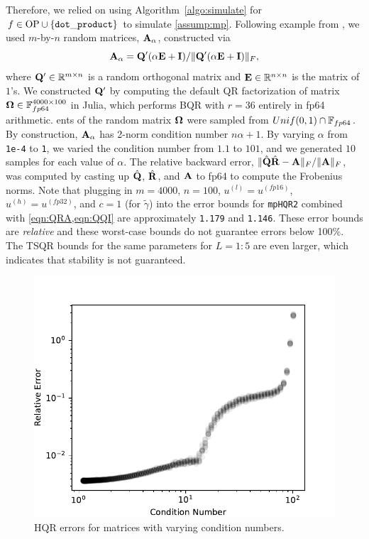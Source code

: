 Therefore, we relied on using Algorithm~\ref{algo:simulate} for $f\in \text{OP} \cup\{{\tt dot\_product}\}$ to simulate \cref{assump:mp}.
Following example from \cite{Mori2012}, we used $m$-by-$n$ random matrices, $\mathbf{A}_{\alpha}$, constructed via
\begin{equation}
\bb{A}_{\alpha} = \bb{Q'}(\alpha \bb{E} + \bb{I})/\|\bb{Q'}(\alpha \bb{E} + \bb{I})\|_F,
\label{eqn:genRM}
\end{equation}
where $\mathbf{Q'}\in\mathbb{R}^{m\times n}$ is a random orthogonal matrix and $\mathbf{E}\in\mathbb{R}^{n\times n}$ is the matrix of $1$'s. 
We constructed $\mathbf{Q'}$ by computing the default QR factorization of matrix $\mathbf{\Omega}\in\mathbb{F}_{fp64}^{4000\times100}$ in Julia, which performs BQR with $r=36$ entirely in fp64 arithmetic.                                                                                                                    ents of the random matrix $\mathbf{\Omega}$ were sampled from $Unif(0,1)\cap \mathbb{F}_{fp64}$.
By construction, $\mathbf{A}_{\alpha}$ has 2-norm condition number $n\alpha+1$. 
By varying $\alpha$ from {\tt 1e-4} to {\tt 1}, we varied the condition number from $1.1$ to $101$, and we generated $10$ samples for each value of $\alpha$.
The relative backward error, $\|\hat{\mathbf{Q}}\hat{\mathbf{R}}-\mathbf{A}\|_F/\|\mathbf{A}\|_F$, was computed by casting up $\hat{\mathbf{Q}}$, $\hat{\mathbf{R}}$, and $\mathbf{A}$ to fp64 to compute the Frobenius norms.
Note that plugging in $m=4000$, $n=100$, $u^{(l)}=u^{(fp16)}$, $u^{(h)}=u^{(fp32)}$, and $c=1$ (for $\tilde{\gamma}$) into the error bounds for {\tt mpHQR2} combined with \cref{eqn:QRA,eqn:QQI} are approximately {\tt 1.179} and {\tt 1.146}.
These error bounds are \emph{relative} and these worst-case bounds do not guarantee errors below 100\%.
The TSQR bounds for the same parameters for $L=1:5$ are even larger, which indicates that stability is not guaranteed. 
\begin{figure}
	\centering
	\vspace{-10pt}
	\includegraphics[width=.3\textwidth]{./figures/unblocked.pdf}
	\caption{\label{fig:unblocked} HQR errors for matrices with varying condition numbers.}
\end{figure}
